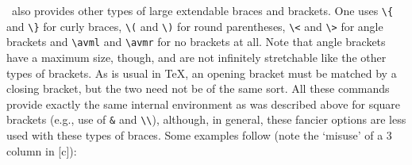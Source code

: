 \av\ also provides other types of large extendable braces and brackets.
One uses \verb+\{+ and \verb+\}+ for curly braces, \verb+\(+ and \verb+\)+
for round parentheses, \verb+\<+ and \verb+\>+ for angle brackets and
\verb+\avml+ and \verb+\avmr+ for no brackets at all.  Note that angle
brackets have a maximum size, though, and are not infinitely stretchable
like the other types of brackets.  As is usual in
\TeX, an opening bracket must be matched by a closing bracket, but the two
need not be of the same sort.  All these commands provide exactly the same
internal 
environment as was described above for square brackets (e.g., use of
\verb+&+ and \verb+\\+), although, in general, these fancier options are
less used with these types of braces.  Some examples follow (note the
`misuse' of a 3 column {\AVM} in [c]):
